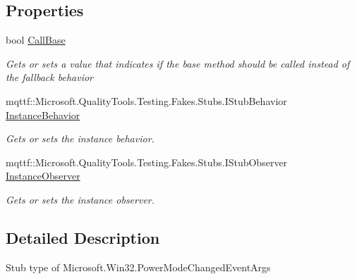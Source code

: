 \subsection*{Properties}
\begin{DoxyCompactItemize}
\item 
bool \hyperlink{class_microsoft_1_1_win32_1_1_fakes_1_1_stub_power_mode_changed_event_args_a16cdb7dab7a259b346c326c933aabeb8}{Call\-Base}
\begin{DoxyCompactList}\small\item\em Gets or sets a value that indicates if the base method should be called instead of the fallback behavior\end{DoxyCompactList}\item 
mqttf\-::\-Microsoft.\-Quality\-Tools.\-Testing.\-Fakes.\-Stubs.\-I\-Stub\-Behavior \hyperlink{class_microsoft_1_1_win32_1_1_fakes_1_1_stub_power_mode_changed_event_args_a3138497663d0c1d129583d2379d0baaf}{Instance\-Behavior}
\begin{DoxyCompactList}\small\item\em Gets or sets the instance behavior.\end{DoxyCompactList}\item 
mqttf\-::\-Microsoft.\-Quality\-Tools.\-Testing.\-Fakes.\-Stubs.\-I\-Stub\-Observer \hyperlink{class_microsoft_1_1_win32_1_1_fakes_1_1_stub_power_mode_changed_event_args_a96847960e6f11d1892d5b9be2229b56b}{Instance\-Observer}
\begin{DoxyCompactList}\small\item\em Gets or sets the instance observer.\end{DoxyCompactList}\end{DoxyCompactItemize}


\subsection{Detailed Description}
Stub type of Microsoft.\-Win32.\-Power\-Mode\-Changed\-Event\-Args



